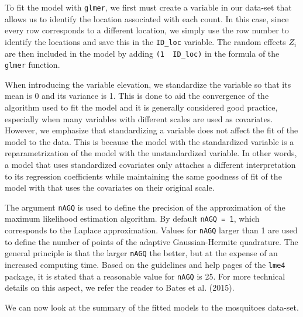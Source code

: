 \documentclass[
  letterpaper,
]{krantz}
\begin{document}
To fit the model with \texttt{glmer}, we first must create a variable in
our data-set that allows us to identify the location associated with
each count. In this case, since every row corresponds to a different
location, we simply use the row number to identify the locations and
save this in the \texttt{ID\_loc} variable. The random effects \(Z_i\)
are then included in the model by adding
\texttt{(1\ \textbar{}\ ID\_loc)} in the formula of the \texttt{glmer}
function.

When introducing the variable elevation, we standardize the variable so
that its mean is 0 and its variance is 1. This is done to aid the
convergence of the algorithm used to fit the model and it is generally
considered good practice, especially when many variables with different
scales are used as covariates. However, we emphasize that standardizing
a variable does not affect the fit of the model to the data. This is
because the model with the standardized variable is a reparametrization
of the model with the unstandardized variable. In other words, a model
that uses standardized covariates only attaches a different
interpretation to its regression coefficients while maintaining the same
goodness of fit of the model with that uses the covariates on their
original scale.

The argument \texttt{nAGQ} is used to define the precision of the
approximation of the maximum likelihood estimation algorithm. By default
\texttt{nAGQ\ =\ 1}, which corresponds to the Laplace approximation.
Values for \texttt{nAGQ} larger than 1 are used to define the number of
points of the adaptive Gaussian-Hermite quadrature. The general
principle is that the larger \texttt{nAGQ} the better, but at the
expense of an increased computing time. Based on the guidelines and help
pages of the \texttt{lme4} package, it is stated that a reasonable value
for \texttt{nAGQ} is 25. For more technical details on this aspect, we
refer the reader to Bates et al. (2015).

We can now look at the summary of the fitted models to the mosquitoes
data-set.
\end{document}

